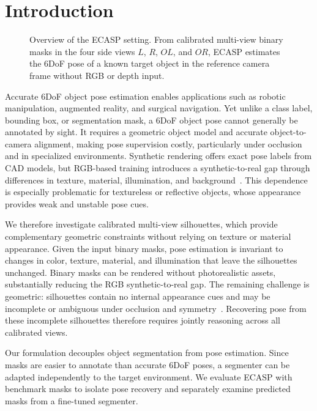 \chapter{Introduction}
\label{sec:intro}


\begin{figure}[H]
\centering
\begingroup
\graphicspath{{graphics/}}
\renewcommand{\sfdefault}{phv}
\resizebox{0.92\textwidth}{!}{%
    
}
\endgroup
\caption{Overview of the ECASP setting. From calibrated multi-view binary masks in the four side views \(L\), \(R\), \(OL\), and \(OR\), ECASP estimates the 6DoF pose of a known target object in the reference camera frame without RGB or depth input.}
\label{fig:teaser}
\end{figure}


Accurate 6DoF object pose estimation enables applications such as robotic manipulation, augmented reality, and surgical navigation.
Yet unlike a class label, bounding box, or segmentation mask, a 6DoF object pose cannot generally be annotated by sight.
It requires a geometric object model and accurate object-to-camera alignment, making pose supervision costly, particularly under occlusion and in specialized environments.
Synthetic rendering offers exact pose labels from CAD models, but RGB-based training introduces a synthetic-to-real gap through differences in texture, material, illumination, and background~\cite{tremblay2018deep}.
This dependence is especially problematic for textureless or reflective objects, whose appearance provides weak and unstable pose cues.

We therefore investigate calibrated multi-view silhouettes, which provide complementary geometric constraints without relying on texture or material appearance.
Given the input binary masks, pose estimation is invariant to changes in color, texture, material, and illumination that leave the silhouettes unchanged.
Binary masks can be rendered without photorealistic assets, substantially reducing the RGB synthetic-to-real gap.
The remaining challenge is geometric: silhouettes contain no internal appearance cues and may be incomplete or ambiguous under occlusion and symmetry~\cite{laurentini1994visual,Guan2010}.
Recovering pose from these incomplete silhouettes therefore requires jointly reasoning across all calibrated views.

Our formulation decouples object segmentation from pose estimation.
Since masks are easier to annotate than accurate 6DoF poses, a segmenter can be adapted independently to the target environment.
We evaluate ECASP with benchmark masks to isolate pose recovery and separately examine predicted masks from a fine-tuned segmenter.

